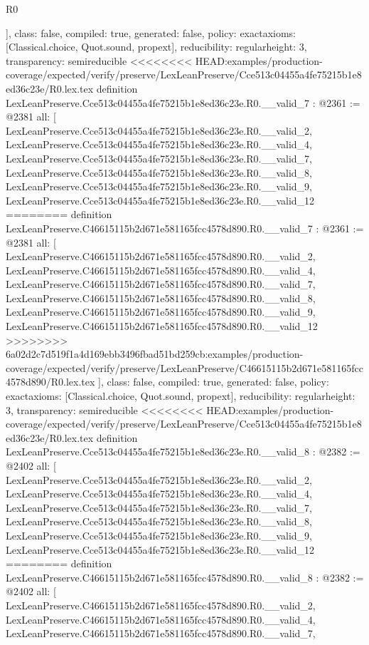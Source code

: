 \begin{lexlean}{R0}
\begin{coremodule}
{{{{{{{{{{{{{{{{{{{{{{{{{{{{{{{{{{{{{{{{{{{{{{  ],
  class: false,
  compiled: true,
  generated: false,
  policy: exact{axioms: [Classical.choice, Quot.sound, propext]},
  reducibility: regular{height: 3},
  transparency: semireducible
}
<<<<<<<< HEAD:examples/production-coverage/expected/verify/preserve/LexLeanPreserve/Cce513c04455a4fe75215b1e8ed36c23e/R0.lex.tex
definition LexLeanPreserve.Cce513c04455a4fe75215b1e8ed36c23e.R0.__valid_7 : @2361 := @2381 {
  all: [
    LexLeanPreserve.Cce513c04455a4fe75215b1e8ed36c23e.R0.__valid_2,
    LexLeanPreserve.Cce513c04455a4fe75215b1e8ed36c23e.R0.__valid_4,
    LexLeanPreserve.Cce513c04455a4fe75215b1e8ed36c23e.R0.__valid_7,
    LexLeanPreserve.Cce513c04455a4fe75215b1e8ed36c23e.R0.__valid_8,
    LexLeanPreserve.Cce513c04455a4fe75215b1e8ed36c23e.R0.__valid_9,
    LexLeanPreserve.Cce513c04455a4fe75215b1e8ed36c23e.R0.__valid_12
========
definition LexLeanPreserve.C46615115b2d671e581165fcc4578d890.R0.__valid_7 : @2361 := @2381 {
  all: [
    LexLeanPreserve.C46615115b2d671e581165fcc4578d890.R0.__valid_2,
    LexLeanPreserve.C46615115b2d671e581165fcc4578d890.R0.__valid_4,
    LexLeanPreserve.C46615115b2d671e581165fcc4578d890.R0.__valid_7,
    LexLeanPreserve.C46615115b2d671e581165fcc4578d890.R0.__valid_8,
    LexLeanPreserve.C46615115b2d671e581165fcc4578d890.R0.__valid_9,
    LexLeanPreserve.C46615115b2d671e581165fcc4578d890.R0.__valid_12
>>>>>>>> 6a02d2c7d519f1a4d169ebb3496fbad51bd259cb:examples/production-coverage/expected/verify/preserve/LexLeanPreserve/C46615115b2d671e581165fcc4578d890/R0.lex.tex
  ],
  class: false,
  compiled: true,
  generated: false,
  policy: exact{axioms: [Classical.choice, Quot.sound, propext]},
  reducibility: regular{height: 3},
  transparency: semireducible
}
<<<<<<<< HEAD:examples/production-coverage/expected/verify/preserve/LexLeanPreserve/Cce513c04455a4fe75215b1e8ed36c23e/R0.lex.tex
definition LexLeanPreserve.Cce513c04455a4fe75215b1e8ed36c23e.R0.__valid_8 : @2382 := @2402 {
  all: [
    LexLeanPreserve.Cce513c04455a4fe75215b1e8ed36c23e.R0.__valid_2,
    LexLeanPreserve.Cce513c04455a4fe75215b1e8ed36c23e.R0.__valid_4,
    LexLeanPreserve.Cce513c04455a4fe75215b1e8ed36c23e.R0.__valid_7,
    LexLeanPreserve.Cce513c04455a4fe75215b1e8ed36c23e.R0.__valid_8,
    LexLeanPreserve.Cce513c04455a4fe75215b1e8ed36c23e.R0.__valid_9,
    LexLeanPreserve.Cce513c04455a4fe75215b1e8ed36c23e.R0.__valid_12
========
definition LexLeanPreserve.C46615115b2d671e581165fcc4578d890.R0.__valid_8 : @2382 := @2402 {
  all: [
    LexLeanPreserve.C46615115b2d671e581165fcc4578d890.R0.__valid_2,
    LexLeanPreserve.C46615115b2d671e581165fcc4578d890.R0.__valid_4,
    LexLeanPreserve.C46615115b2d671e581165fcc4578d890.R0.__valid_7,
}}}}}}}}}}}}}}}}}}}}}}}}}}}}}}}}}}}}}}}}}}}}}}}}
\end{coremodule}
\end{lexlean}
